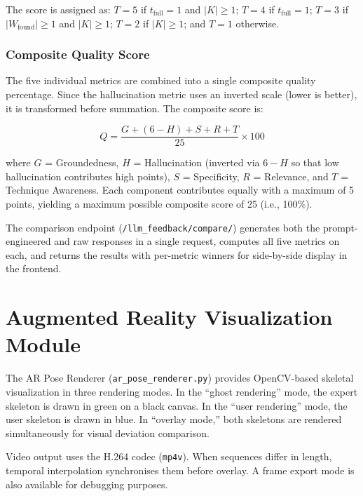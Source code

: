 The score is assigned as: $T = 5$ if $t_{\text{full}} = 1$ and $|K| \geq 1$; $T = 4$ if $t_{\text{full}} = 1$; $T = 3$ if $|W_{\text{found}}| \geq 1$ and $|K| \geq 1$; $T = 2$ if $|K| \geq 1$; and $T = 1$ otherwise.


\subsubsection{Composite Quality Score}

The five individual metrics are combined into a single composite quality percentage. Since the hallucination metric uses an inverted scale (lower is better), it is transformed before summation. The composite score is:

\[
Q = \frac{G + (6 - H) + S + R + T}{25} \times 100
\]

\noindent where $G$ = Groundedness, $H$ = Hallucination (inverted via $6 - H$ so that low hallucination contributes high points), $S$ = Specificity, $R$ = Relevance, and $T$ = Technique Awareness. Each component contributes equally with a maximum of 5 points, yielding a maximum possible composite score of 25 (i.e., 100\%).

The comparison endpoint (\texttt{/llm\_feedback/compare/}) generates both the prompt-engineered and raw responses in a single request, computes all five metrics on each, and returns the results with per-metric winners for side-by-side display in the frontend.


\section{Augmented Reality Visualization Module}

The AR Pose Renderer (\texttt{ar\_pose\_renderer.py}) provides OpenCV-based skeletal visualization in three rendering modes. In the ``ghost rendering'' mode, the expert skeleton is drawn in green on a black canvas. In the ``user rendering'' mode, the user skeleton is drawn in blue. In ``overlay mode,'' both skeletons are rendered simultaneously for visual deviation comparison.

Video output uses the H.264 codec (\texttt{mp4v}). When sequences differ in length, temporal interpolation synchronises them before overlay. A frame export mode is also available for debugging purposes.
